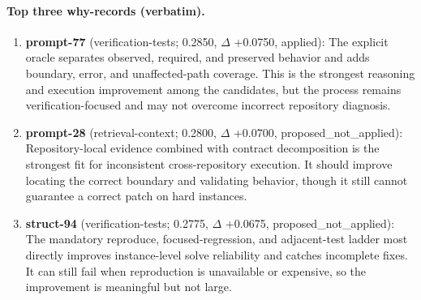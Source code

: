 \paragraph{Top three why-records (verbatim).}\begin{enumerate}\itemsep1pt
\item \textbf{prompt-77} (verification-tests; 0.2850, $\Delta$ +0.0750, applied): The explicit oracle separates observed, required, and preserved behavior and adds boundary, error, and unaffected-path coverage. This is the strongest reasoning and execution improvement among the candidates, but the process remains verification-focused and may not overcome incorrect repository diagnosis.
\item \textbf{prompt-28} (retrieval-context; 0.2800, $\Delta$ +0.0700, proposed\_not\_applied): Repository-local evidence combined with contract decomposition is the strongest fit for inconsistent cross-repository execution. It should improve locating the correct boundary and validating behavior, though it still cannot guarantee a correct patch on hard instances.
\item \textbf{struct-94} (verification-tests; 0.2775, $\Delta$ +0.0675, proposed\_not\_applied): The mandatory reproduce, focused-regression, and adjacent-test ladder most directly improves instance-level solve reliability and catches incomplete fixes. It can still fail when reproduction is unavailable or expensive, so the improvement is meaningful but not large.
\end{enumerate}
